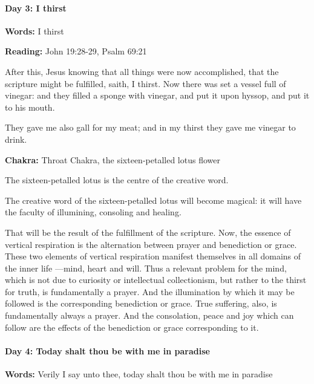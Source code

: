 \paragraph{Day 3: I thirst}

\textbf{Words:} I thirst

\textbf{Reading:} John 19:28-29, Psalm 69:21


\begin{quotex}
After this, Jesus knowing that all things were now accomplished, that the scripture might be fulfilled, saith, I thirst. Now there was set a vessel full of vinegar: and they filled a sponge with vinegar, and put it upon hyssop, and put it to his mouth.

They gave me also gall for my meat; and in my thirst they gave me vinegar to drink. 

\end{quotex}
\textbf{Chakra:} Throat Chakra, the sixteen-petalled lotus flower

The sixteen-petalled lotus is the centre of the creative word.

The creative word of the sixteen-petalled lotus will become magical: it will have the faculty of illumining, consoling and healing.


\begin{quotex}
That will be the result of the fulfillment of the scripture. Now, the essence of vertical respiration is the alternation between prayer and benediction or grace. These two elements of vertical respiration manifest themselves in all domains of the inner life —mind, heart and will. Thus a relevant problem for the mind, which is not due to curiosity or intellectual collectionism, but rather to the thirst for truth, is fundamentally a prayer. And the illumination by which it may be followed is the corresponding benediction or grace. True suffering, also, is fundamentally always a prayer. And the consolation, peace and joy which can follow are the effects of the benediction or grace corresponding to it. 


\end{quotex}

\paragraph{Day 4: Today shalt thou be with me in paradise}
\textbf{Words:} Verily I say unto thee, today shalt thou be with me in paradise

